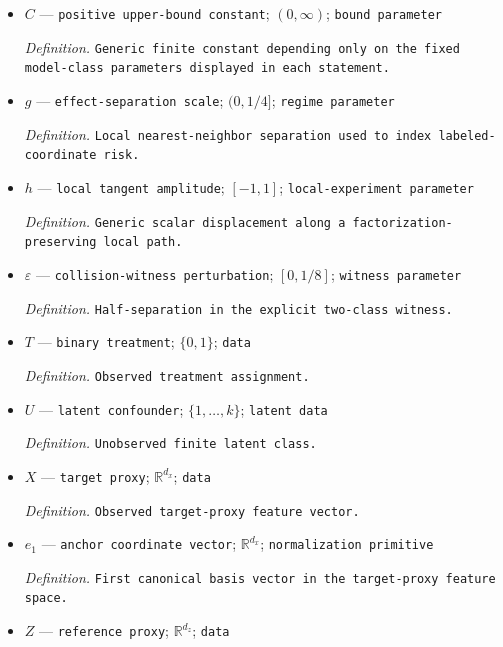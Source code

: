 \documentclass{article}
\begin{document}
\begin{itemize}
  \par\smallskip\noindent\emph{Definition.} \texttt{Generic constant in the displayed minimax lower bounds.}
  \item \(C\) --- \texttt{positive upper-\allowbreak{}bound constant}; \((0,\infty)\); \texttt{bound parameter}
  \par\smallskip\noindent\emph{Definition.} \texttt{Generic finite constant depending only on the fixed model-\allowbreak{}class parameters displayed in each statement.}
  \item \(g\) --- \texttt{effect-\allowbreak{}separation scale}; \((0,1/4]\); \texttt{regime parameter}
  \par\smallskip\noindent\emph{Definition.} \texttt{Local nearest-\allowbreak{}neighbor separation used to index labeled-\allowbreak{}coordinate risk.}
  \item \(h\) --- \texttt{local tangent amplitude}; \([-1,1]\); \texttt{local-\allowbreak{}experiment parameter}
  \par\smallskip\noindent\emph{Definition.} \texttt{Generic scalar displacement along a factorization-\allowbreak{}preserving local path.}
  \item \(\varepsilon\) --- \texttt{collision-\allowbreak{}witness perturbation}; \([0,1/8]\); \texttt{witness parameter}
  \par\smallskip\noindent\emph{Definition.} \texttt{Half-\allowbreak{}separation in the explicit two-\allowbreak{}class witness.}
  \item \(T\) --- \texttt{binary treatment}; \(\{0,1\}\); \texttt{data}
  \par\smallskip\noindent\emph{Definition.} \texttt{Observed treatment assignment.}
  \item \(U\) --- \texttt{latent confounder}; \(\{1,\ldots,k\}\); \texttt{latent data}
  \par\smallskip\noindent\emph{Definition.} \texttt{Unobserved finite latent class.}
  \item \(X\) --- \texttt{target proxy}; \(\mathbb R^{d_x}\); \texttt{data}
  \par\smallskip\noindent\emph{Definition.} \texttt{Observed target-\allowbreak{}proxy feature vector.}
  \item \(e_1\) --- \texttt{anchor coordinate vector}; \(\mathbb R^{d_x}\); \texttt{normalization primitive}
  \par\smallskip\noindent\emph{Definition.} \texttt{First canonical basis vector in the target-\allowbreak{}proxy feature space.}
  \item \(Z\) --- \texttt{reference proxy}; \(\mathbb R^{d_z}\); \texttt{data}

\end{itemize}
\end{document}
